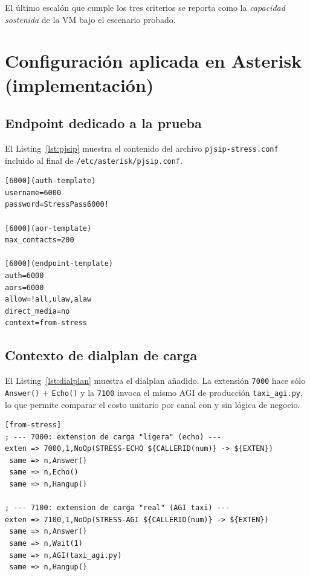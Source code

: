 \documentclass[conference]{IEEEtran}
\begin{document}
El \'ultimo escal\'on que cumple los tres criterios se reporta como la
\textit{capacidad sostenida} de la VM bajo el escenario probado.

\section{Configuraci\'on aplicada en Asterisk (implementaci\'on)}

\subsection{Endpoint dedicado a la prueba}

El Listing~\ref{lst:pjsip} muestra el contenido del archivo
\texttt{pjsip-stress.conf} incluido al final de
\texttt{/etc/asterisk/pjsip.conf}.

\begin{lstlisting}[language={},caption={\texttt{pjsip-stress.conf}: endpoint SIPp con auth digest.},label=lst:pjsip]
[6000](auth-template)
username=6000
password=StressPass6000!

[6000](aor-template)
max_contacts=200

[6000](endpoint-template)
auth=6000
aors=6000
allow=!all,ulaw,alaw
direct_media=no
context=from-stress
\end{lstlisting}

\subsection{Contexto de dialplan de carga}

El Listing~\ref{lst:dialplan} muestra el dialplan a\~nadido. La
extensi\'on \texttt{7000} hace s\'olo \texttt{Answer()} + \texttt{Echo()}
y la \texttt{7100} invoca el mismo AGI de producci\'on
\texttt{taxi\_agi.py}, lo que permite comparar el costo unitario por
canal con y sin l\'ogica de negocio.

\begin{lstlisting}[language={},caption={\texttt{extensions-stress.conf}: contexto \texttt{from-stress}.},label=lst:dialplan]
[from-stress]
; --- 7000: extension de carga "ligera" (echo) ---
exten => 7000,1,NoOp(STRESS-ECHO ${CALLERID(num)} -> ${EXTEN})
 same => n,Answer()
 same => n,Echo()
 same => n,Hangup()

; --- 7100: extension de carga "real" (AGI taxi) ---
exten => 7100,1,NoOp(STRESS-AGI ${CALLERID(num)} -> ${EXTEN})
 same => n,Answer()
 same => n,Wait(1)
 same => n,AGI(taxi_agi.py)
 same => n,Hangup()
\end{lstlisting}
\end{document}
